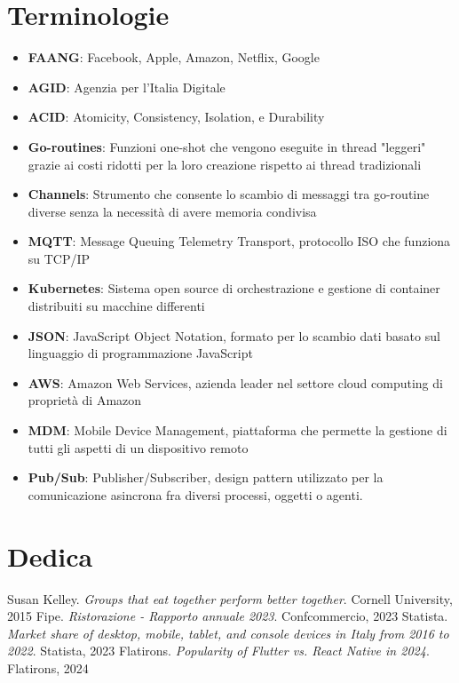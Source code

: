 \documentclass[a4paper, titlepage, 12pt, openright, twoside]{book}
\begin{document}
\chapter{Terminologie}\label{chap:terminologie}

\begin{itemize}
	\item \textbf{FAANG}: Facebook, Apple, Amazon, Netflix, Google
	\item \textbf{AGID}: Agenzia per l'Italia Digitale
	\item \textbf{ACID}: Atomicity, Consistency, Isolation, e Durability
	\item \textbf{Go-routines}: Funzioni one-shot che vengono eseguite in thread "leggeri" grazie ai costi ridotti per la loro creazione rispetto ai thread tradizionali
	\item \textbf{Channels}: Strumento che consente lo scambio di messaggi tra go-routine diverse senza la necessità di avere memoria condivisa
	\item \textbf{MQTT}: Message Queuing Telemetry Transport, protocollo ISO che funziona su TCP/IP
	\item \textbf{Kubernetes}: Sistema open source di orchestrazione e gestione di container distribuiti su macchine differenti
	\item \textbf{JSON}: JavaScript Object Notation, formato per lo scambio dati basato sul linguaggio di programmazione JavaScript
	\item \textbf{AWS}: Amazon Web Services, azienda leader nel settore cloud computing di proprietà di Amazon
	\item \textbf{MDM}: Mobile Device Management, piattaforma che permette la gestione di tutti gli aspetti di un dispositivo remoto
	\item \textbf{Pub/Sub}: Publisher/Subscriber, design pattern utilizzato per la comunicazione asincrona fra diversi processi, oggetti o agenti.
\end{itemize}

\chapter{Dedica}\label{chap:dedica}

\begin{thebibliography}{9}
	 Susan Kelley. \textsl{Groups that eat together perform better together}. Cornell University, 2015
	 Fipe. \textsl{Ristorazione - Rapporto annuale 2023}. Confcommercio, 2023
	 Statista. \textsl{Market share of desktop, mobile, tablet, and console devices in Italy from 2016 to 2022}. Statista, 2023
	 Flatirons. \textsl{Popularity of Flutter vs. React Native in 2024}. Flatirons, 2024
\end{thebibliography}
\end{document}
